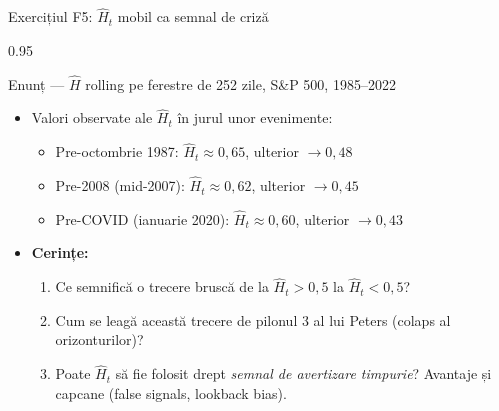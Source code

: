 \documentclass[9pt, aspectratio=169, t]{beamer}
\begin{document}
\begin{frame}[shrink=25]{Exercițiul F5: $\hat H_t$ mobil ca semnal de criză}
\begin{cminipage}{0.95\textwidth}
\begin{block}{Enunț --- $\hat H$ rolling pe ferestre de 252 zile, S\&P 500, 1985--2022}
\begin{itemize}\setlength{\itemsep}{0pt}
    \item Valori observate ale $\hat H_t$ în jurul unor evenimente:
    \begin{itemize}\setlength{\itemsep}{0pt}
        \item Pre-octombrie 1987: $\hat H_t \approx 0{,}65$, ulterior $\to 0{,}48$
        \item Pre-2008 (mid-2007): $\hat H_t \approx 0{,}62$, ulterior $\to 0{,}45$
        \item Pre-COVID (ianuarie 2020): $\hat H_t \approx 0{,}60$, ulterior $\to 0{,}43$
    \end{itemize}
    \item \textbf{Cerințe:}
    \begin{enumerate}\setlength{\itemsep}{0pt}
        \item Ce semnifică o trecere bruscă de la $\hat H_t > 0{,}5$ la $\hat H_t < 0{,}5$?
        \item Cum se leagă această trecere de pilonul 3 al lui Peters (colaps al orizonturilor)?
        \item Poate $\hat H_t$ să fie folosit drept \emph{semnal de avertizare timpurie}? Avantaje și capcane (false signals, lookback bias).
    \end{enumerate}
\end{itemize}
\end{block}
\end{cminipage}
\end{frame}
\end{document}
